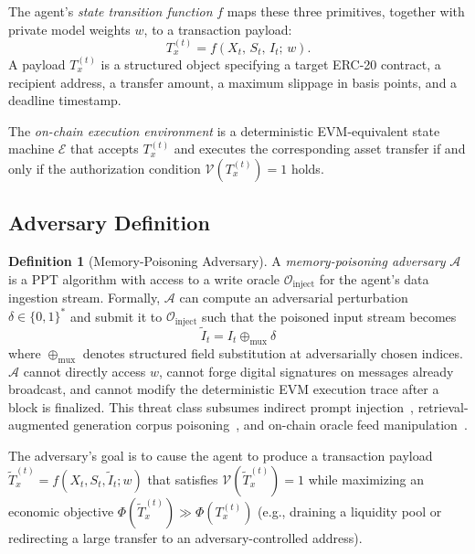 \documentclass[final,5p,times,twocolumn]{elsarticle}
\theoremstyle{plain}
\theoremstyle{definition}
\newtheorem{definition}[theorem]{Definition}
\theoremstyle{remark}
\newcommand{\Adv}{\mathcal{A}}
\begin{document}
The agent's \emph{state transition function} $f$ maps these three primitives,
together with private model weights $w$, to a transaction payload:
\begin{equation}
  T_x^{(t)} = f\!\left(X_t,\, S_t,\, I_t;\, w\right).
  \label{eq:stf}
\end{equation}
A payload $T_x^{(t)}$ is a structured object specifying a target ERC-20
contract, a recipient address, a transfer amount, a maximum slippage in basis
points, and a deadline timestamp.

The \emph{on-chain execution environment} is a deterministic EVM-equivalent
state machine $\mathcal{E}$ that accepts $T_x^{(t)}$ and executes the
corresponding asset transfer if and only if the authorization condition
$\mathcal{V}(T_x^{(t)}) = 1$ holds.

\subsection{Adversary Definition}
\label{sec:adversary}

\begin{definition}[Memory-Poisoning Adversary]
\label{def:adversary}
A \emph{memory-poisoning adversary} $\Adv$ is a PPT algorithm with access to
a write oracle $\mathcal{O}_{\mathrm{inject}}$ for the agent's data ingestion
stream. Formally, $\Adv$ can compute an adversarial perturbation
$\delta \in \{0,1\}^{*}$ and submit it to $\mathcal{O}_{\mathrm{inject}}$
such that the poisoned input stream becomes
$$\tilde{I}_t = I_t \oplus_{\mathrm{mux}} \delta$$
where $\oplus_{\mathrm{mux}}$ denotes structured field substitution at
adversarially chosen indices. $\Adv$ cannot directly access $w$, cannot
forge digital signatures on messages already broadcast, and cannot modify
the deterministic EVM execution trace after a block is finalized. This
threat class subsumes indirect prompt injection~\cite{greshake2023ipi},
retrieval-augmented generation corpus poisoning~\cite{poisonedrag2024}, and
on-chain oracle feed manipulation~\cite{defitrace2024}.
\end{definition}

The adversary's goal is to cause the agent to produce a transaction payload
$\tilde{T}_x^{(t)} = f(X_t, S_t, \tilde{I}_t; w)$ that satisfies
$\mathcal{V}(\tilde{T}_x^{(t)}) = 1$ while maximizing an economic objective
$\Phi(\tilde{T}_x^{(t)}) \gg \Phi(T_x^{(t)})$ (e.g., draining a liquidity pool
or redirecting a large transfer to an adversary-controlled address).
\end{document}
